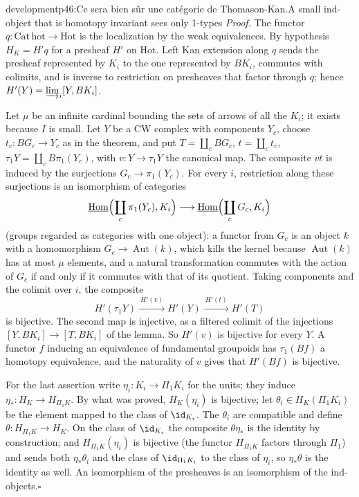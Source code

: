 \begin{dcomment}{development}{p46:Ce sera bien sûr une catégorie de Thomason-Kan.}{A small ind-object that is homotopy invariant sees only 1-types}
\textit{Proof.}
The functor $q:\mathrm{Cat}\,\mathrm{hot}\to\mathrm{Hot}$ is the localization by the weak equivalences. By hypothesis $H_K=H'q$ for a presheaf $H'$ on $\mathrm{Hot}$. Left Kan extension along $q$ sends the presheaf represented by $K_i$ to the one represented by $BK_i$, commutes with colimits, and is inverse to restriction on presheaves that factor through $q$; hence $H'(Y)=\varinjlim_i[Y,BK_i]$.

Let $\mu$ be an infinite cardinal bounding the sets of arrows of all the $K_i$; it exists because $I$ is small. Let $Y$ be a CW complex with components $Y_c$, choose $t_c:BG_c\to Y_c$ as in the theorem, and put $T=\coprod_cBG_c$, $t=\coprod_ct_c$, $\tau_1Y=\coprod_cB\pi_1(Y_c)$, with $v:Y\to\tau_1Y$ the canonical map. The composite $vt$ is induced by the surjections $G_c\to\pi_1(Y_c)$. For every $i$, restriction along these surjections is an isomorphism of categories
\[
 \underline{\operatorname{Hom}}\Bigl(\coprod_c\pi_1(Y_c),K_i\Bigr)\longrightarrow\underline{\operatorname{Hom}}\Bigl(\coprod_cG_c,K_i\Bigr)
\]
(groups regarded as categories with one object): a functor from $G_c$ is an object $k$ with a homomorphism $G_c\to\operatorname{Aut}(k)$, which kills the kernel because $\operatorname{Aut}(k)$ has at most $\mu$ elements, and a natural transformation commutes with the action of $G_c$ if and only if it commutes with that of its quotient. Taking components and the colimit over $i$, the composite
\[
 H'(\tau_1Y)\xrightarrow{\ H'(v)\ }H'(Y)\xrightarrow{\ H'(t)\ }H'(T)
\]
is bijective. The second map is injective, as a filtered colimit of the injections $[Y,BK_i]\to[T,BK_i]$ of the lemma. So $H'(v)$ is bijective for every $Y$. A functor $f$ inducing an equivalence of fundamental groupoids has $\tau_1(Bf)$ a homotopy equivalence, and the naturality of $v$ gives that $H'(Bf)$ is bijective.

For the last assertion write $\eta_i:K_i\to\Pi_1K_i$ for the units; they induce $\eta_*:H_K\to H_{\Pi_1K}$. By what was proved, $H_K(\eta_i)$ is bijective; let $\theta_i\in H_K(\Pi_1K_i)$ be the element mapped to the class of $\id_{K_i}$. The $\theta_i$ are compatible and define $\theta:H_{\Pi_1K}\to H_K$. On the class of $\id_{K_i}$ the composite $\theta\eta_*$ is the identity by construction; and $H_{\Pi_1K}(\eta_i)$ is bijective (the functor $H_{\Pi_1K}$ factors through $\Pi_1$) and sends both $\eta_*\theta_i$ and the class of $\id_{\Pi_1K_i}$ to the class of $\eta_i$, so $\eta_*\theta$ is the identity as well. An isomorphism of the presheaves is an isomorphism of the ind-objects.\hfill$\square$


\end{dcomment}
